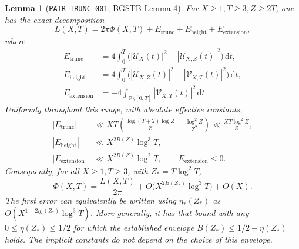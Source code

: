 \documentclass[11pt]{article}
\newtheorem{lemma}{Lemma}
\newcommand{\dd}{\,\mathrm d}
\newcommand{\VS}{\mathcal V}
\newcommand{\US}{\mathcal U}
\newcommand{\ELtr}{E_{\mathrm{trunc}}}
\newcommand{\ELh}{E_{\mathrm{height}}}
\newcommand{\ELext}{E_{\mathrm{extension}}}
\begin{document}
\begin{lemma}[\texttt{PAIR-TRUNC-001}; BGSTB Lemma 4]\label{lem:pair-trunc}
For \(X\geq1,T\geq3,Z\geq2T\), one has the exact decomposition
\begin{equation}\label{eq:trunc-decomposition}
 L(X,T)=2\pi\Phi(X,T)+\ELtr+\ELh+\ELext,
\end{equation}
where
\begin{align}
 \ELtr&=4\int_0^T
       \bigl(|\US_X(t)|^2-|\US_{X,Z}(t)|^2\bigr)\dd t,
       \label{eq:error-trunc-definition}\\
 \ELh&=4\int_0^T
       \bigl(|\US_{X,Z}(t)|^2-|\VS_{X,T}(t)|^2\bigr)\dd t,
       \label{eq:error-height-definition}\\
 \ELext&=-4\int_{\mathbb R\setminus[0,T]}|\VS_{X,T}(t)|^2\dd t.
       \label{eq:error-extension-definition}
\end{align}
Uniformly throughout this range, with absolute effective constants,
\begin{align}
 |\ELtr|&\ll XT\left(
       \frac{\log(T+2)\log Z}{Z}+\frac{\log^2Z}{Z^2}\right)
       \ll\frac{XT\log^2Z}{Z},\label{eq:error-trunc-bound}\\
 |\ELh|&\ll X^{2B(Z)}\log^3T,\label{eq:error-height-bound}\\
 |\ELext|&\ll X^{2B(Z)}\log^2T,\qquad \ELext\leq0.
       \label{eq:error-extension-bound}
\end{align}
Consequently, for all \(X\geq1,T\geq3\), with \(Z_*=T\log^2T\),
\begin{equation}\label{eq:pair-trunc-final}
 \Phi(X,T)=\frac{L(X,T)}{2\pi}
       +O\bigl(X^{2B(Z_*)}\log^3T\bigr)+O(X).
\end{equation}
The first error can equivalently be written using \(\eta_*(Z_*)\) as
\(O(X^{1-2\eta_*(Z_*)}\log^3T)\). More generally, it has that bound
with any \(0\leq\eta(Z_*)\leq1/2\) for which the established envelope
\(B(Z_*)\leq1/2-\eta(Z_*)\) holds. The implicit constants do not
depend on the choice of this envelope.
\end{lemma}
\end{document}
